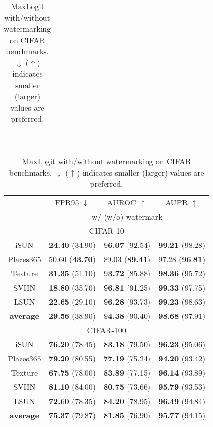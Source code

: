 \documentclass{article}
\begin{document}
\begin{table}[t]
{{\begin{tabular}{c|ccc}
\end{tabular}
}}~~~~
\parbox{.47\linewidth}{
    \centering
\caption{{MaxLogit with/without watermarking  on CIFAR benchmarks. $\downarrow$ ($\uparrow$) indicates smaller (larger) values are preferred.}} \label{tab: maxlogit}
\vspace{5pt}
\scriptsize
{
\begin{tabular}{c|ccc}
\toprule[1.5pt]
                   & FPR95 $\downarrow$     & AUROC $\uparrow$       & AUPR $\uparrow$      \\
                   \cline{2-4} 
\multirow{-2}{*}{} & \multicolumn{3}{c}{w/ (w/o) watermark} \\
\midrule[0.6pt]
\multicolumn{4}{c}{\cellcolor{greyL}CIFAR-10} \\
\midrule[0.6pt]
iSUN               & \textbf{24.40} (34.90) & \textbf{96.07} (92.54) & \textbf{99.21} (98.28) \\ 
Places$365$        & 50.60 (\textbf{43.70}) & 89.03 (\textbf{89.41}) & 97.28 (\textbf{96.81}) \\ 
Texture            & \textbf{31.35} (51.10) & \textbf{93.72} (85.88) & \textbf{98.36} (95.72) \\ 
SVHN               & \textbf{18.80} (35.70) & \textbf{96.81} (91.25) & \textbf{99.33} (97.75) \\ 
LSUN               & \textbf{22.65} (29.10) & \textbf{96.28} (93.73) & \textbf{99.23} (98.63) \\ 
\midrule
\textbf{average}   & \textbf{29.56} (38.90) & \textbf{94.38} (90.40) & \textbf{98.68} (97.91) \\  \midrule[1pt]
\multicolumn{4}{c}{\cellcolor{greyL}CIFAR-100} \\
\midrule[1pt]
iSUN               & \textbf{76.20} (78.45) & \textbf{83.18} (79.50) & \textbf{96.23} (95.06) \\ 
Places$365$        & \textbf{79.20} (80.55) & \textbf{77.19} (75.24) & \textbf{94.20} (93.42) \\ 
Texture            & \textbf{67.75} (78.00) & \textbf{83.89} (77.15) & \textbf{96.14} (93.89) \\ 
SVHN               & \textbf{81.10} (84.00) & \textbf{80.75} (73.66) & \textbf{95.79} (93.53) \\ 
LSUN               & \textbf{72.60} (78.35) & \textbf{84.20} (78.95) & \textbf{96.49} (94.84) \\ 
\midrule
\textbf{average}   & \textbf{75.37} (79.87) & \textbf{81.85} (76.90) & \textbf{95.77} (94.15) \\  \bottomrule[1.5pt]      
\end{tabular}
}}
\end{table}
\end{document}
